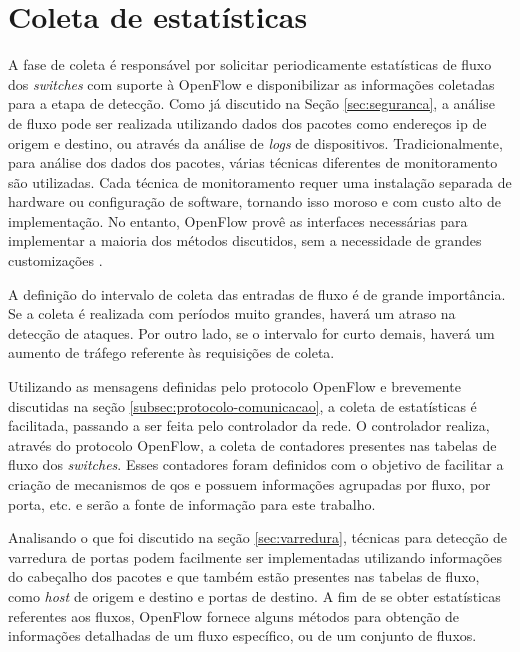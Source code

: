 \section{Coleta de estatísticas}
\label{sec:coleta}

A fase de coleta é responsável por solicitar periodicamente estatísticas de fluxo dos \textit{switches} com suporte à OpenFlow e disponibilizar as informações coletadas para a etapa de detecção. Como já discutido na Seção \ref{sec:seguranca}, a análise de fluxo pode ser realizada utilizando dados dos pacotes como endereços \gls{ip} de origem e destino, ou através da análise de \textit{logs} de dispositivos. Tradicionalmente, para análise dos dados dos pacotes, várias técnicas diferentes de monitoramento são utilizadas. Cada técnica de monitoramento requer uma instalação separada de hardware ou configuração de software, tornando isso moroso e com custo alto de implementação. No entanto, OpenFlow  provê as interfaces necessárias para implementar a maioria dos métodos discutidos, sem a necessidade de grandes customizações \cite{Adrichem:2014}.

A definição do intervalo de coleta das entradas de fluxo é de grande importância. Se a coleta é realizada com períodos muito grandes, haverá um atraso na detecção de ataques. Por outro lado, se o intervalo for curto demais, haverá um aumento de tráfego referente às requisições de coleta.

Utilizando as mensagens definidas pelo protocolo OpenFlow e brevemente discutidas na seção \ref{subsec:protocolo-comunicacao}, a coleta de estatísticas é facilitada, passando a ser feita pelo controlador da rede. O controlador realiza, através do protocolo OpenFlow, a coleta de contadores presentes nas tabelas de fluxo dos \textit{switches}. Esses contadores foram definidos com o objetivo de facilitar a criação de mecanismos de \gls{qos} \cite{website:onf} e possuem informações agrupadas por fluxo, por porta, etc. e serão a fonte de informação para este trabalho.

Analisando o que foi discutido na seção \ref{sec:varredura}, técnicas para detecção de varredura de portas podem facilmente ser implementadas utilizando informações do cabeçalho dos pacotes e que também estão presentes nas tabelas de fluxo, como \textit{host} de origem e destino e portas de destino. A fim de se obter estatísticas referentes aos fluxos, OpenFlow fornece alguns métodos para obtenção de informações detalhadas de um fluxo específico, ou de um conjunto de fluxos.

